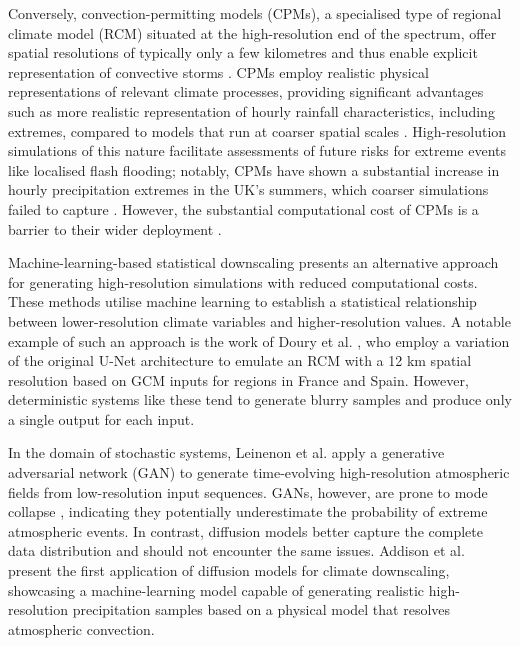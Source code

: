 \documentclass[ oneside,%
                    author={George Herbert},
                    degree={MSci},
                     title={Diffusion Models for Time-Evolving Precipitation Fields},
                  subtitle={}]{dissertation}
\begin{document}
Conversely, convection-permitting models (CPMs), a specialised type of regional climate model (RCM) situated at the high-resolution end of the spectrum, offer spatial resolutions of typically only a few kilometres and thus enable explicit representation of convective storms \cite{MO_CPM}. CPMs employ realistic physical representations of relevant climate processes, providing significant advantages such as more realistic representation of hourly rainfall characteristics, including extremes, compared to models that run at coarser spatial scales \cite{Kendon_Heavier_Summer_Downpours}. High-resolution simulations of this nature facilitate assessments of future risks for extreme events like localised flash flooding; notably, CPMs have shown a substantial increase in hourly precipitation extremes in the UK's summers, which coarser simulations failed to capture \cite{Kendon_Heavier_Summer_Downpours}. However, the substantial computational cost of CPMs is a barrier to their wider deployment \cite{MO_CPM}.

Machine-learning-based statistical downscaling presents an alternative approach for generating high-resolution simulations with reduced computational costs. These methods utilise machine learning to establish a statistical relationship between lower-resolution climate variables and higher-resolution values. A notable example of such an approach is the work of Doury et al. \cite{Doury_Regional_Climate_Model_Emulator}, who employ a variation of the original U-Net architecture \cite{Ronneberger_U-Net} to emulate an RCM with a 12 km spatial resolution based on GCM inputs for regions in France and Spain. However, deterministic systems like these tend to generate blurry samples \cite{Ravuri_Skillful_Precipitation_Nowcasting} and produce only a single output for each input.

In the domain of stochastic systems, Leinenon et al. \cite{Leinonen_Stochastic_Super-Resolution} apply a generative adversarial network (GAN) \cite{Goodfellow_Generative_Adversarial_Networks} to generate time-evolving high-resolution atmospheric fields from low-resolution input sequences. GANs, however, are prone to mode collapse \cite{Thanh-Tung_Mode_Collapse}, indicating they potentially underestimate the probability of extreme atmospheric events. In contrast, diffusion models better capture the complete data distribution and should not encounter the same issues. Addison et al. \cite{Addison_Machine_Learning_Emulation} present the first application of diffusion models for climate downscaling, showcasing a machine-learning model capable of generating realistic high-resolution precipitation samples based on a physical model that resolves atmospheric convection. 
\end{document}
